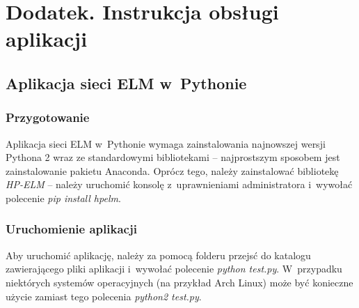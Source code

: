 \documentclass[pl]{minipw} %
\begin{document}
\chapter*{Dodatek. Instrukcja obsługi aplikacji}
\section*{Aplikacja sieci ELM w~Pythonie}
\subsection*{Przygotowanie}
Aplikacja sieci ELM w~Pythonie wymaga zainstalowania najnowszej wersji Pythona 2 wraz ze standardowymi bibliotekami -- najprostszym sposobem jest zainstalowanie pakietu Anaconda. Oprócz tego, należy zainstalować bibliotekę \textit{HP-ELM} -- należy uruchomić konsolę z~uprawnieniami administratora i~wywołać polecenie \textit{pip install hpelm}. 
\subsection*{Uruchomienie aplikacji}
Aby uruchomić aplikację, należy za pomocą folderu przejsć do katalogu zawierającego pliki aplikacji i~wywołać polecenie \textit{python test.py}. W~przypadku niektórych systemów operacyjnych (na przykład Arch Linux) może być konieczne użycie zamiast tego polecenia \textit{python2 test.py}.
\clearpage
\end{document}
